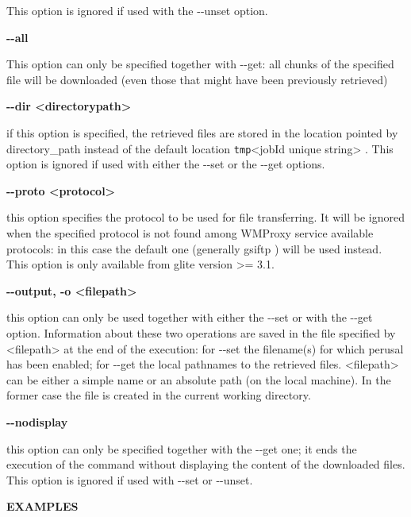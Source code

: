 This option is ignored if used with the -{}-unset option.





\textbf{-{}-all}

This option can only be specified together with -{}-get: all chunks of the specified file will be downloaded 
(even those that might have been previously retrieved)





\textbf{-{}-dir <directorypath>}

if this option is specified, the retrieved files are stored in the location pointed by 
directory\_path instead of the default location \verb /tmp/<jobId unique string> {}. 
This option is ignored if used with either the -{}-set or the -{}-get options.





\textbf{-{}-proto <protocol>}

this option specifies the protocol to be used for file transferring. It will be ignored when the specified 
protocol is not found among WMProxy service available protocols: in this case the default one 
(generally gsiftp ) will be used instead.
This option is only available from glite version >= 3.1.





\textbf{-{}-output, -o <filepath>}

this option can only be used together with either the -{}-set or with the -{}-get option.
Information about these two operations are saved in the file specified by <filepath> at the end of the execution: 
for -{}-set the filename(s) for which perusal has been enabled; for -{}-get the local pathnames to the retrieved files. 
<filepath> can be either a simple name or an absolute path (on the local machine). In the former case the file is 
created in the current working directory.





\textbf{-{}-nodisplay}

this option can only be specified together with the -{}-get one; it ends the execution of the command without 
displaying the content of the downloaded files. This option is ignored if used with -{}-set or -{}-unset.



\medskip
\textbf{EXAMPLES}
\smallskip


